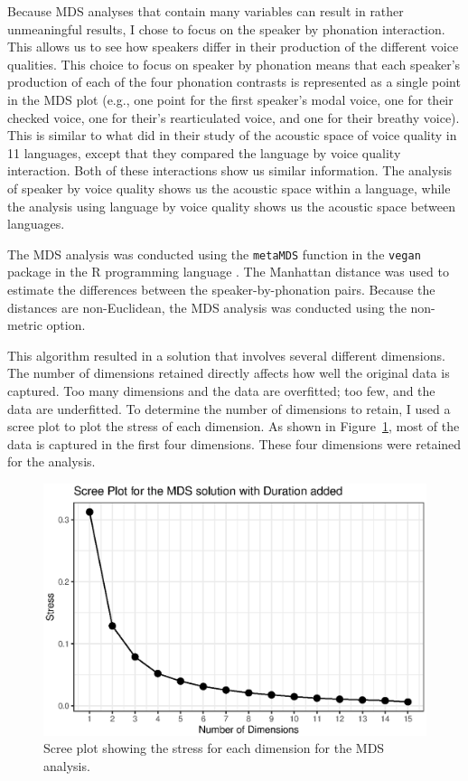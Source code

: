 Because MDS analyses that contain many variables can result in rather unmeaningful results, I chose to focus on the speaker by phonation interaction. This allows us to see how speakers differ in their production of the different voice qualities. This choice to focus on speaker by phonation means that each speaker's production of each of the four phonation contrasts is represented as a single point in the MDS plot (e.g., one point for the first speaker's modal voice, one for their checked voice, one for their's rearticulated voice, and one for their breathy voice). This is similar to what \citet{keatingCrosslanguageAcousticSpace2023} did in their study of the acoustic space of voice quality in 11 languages, except that they compared the language by voice quality interaction. Both of these interactions show us similar information. The analysis of speaker by voice quality shows us the acoustic space within a language, while the analysis using language by voice quality shows us the acoustic space between languages.

The MDS analysis was conducted using the \texttt{metaMDS} function in the \texttt{vegan} package \citep{oksanenVeganCommunityEcology2025} in the R programming language \citep{rcoreteamLanguageEnvironmentStatistical2024}. The Manhattan distance was used to estimate the differences between the speaker-by-phonation pairs. Because the distances are non-Euclidean, the MDS analysis was conducted using the non-metric option.

This algorithm resulted in a solution that involves several different dimensions. The number of dimensions retained directly affects how well the original data is captured. Too many dimensions and the data are overfitted; too few, and the data are underfitted. To determine the number of dimensions to retain, I used a scree plot to plot the stress of each dimension. As shown in Figure~\ref{fig:stress_plot}, most of the data is captured in the first four dimensions. These four dimensions were retained for the analysis.

\begin{figure}[!ht]
    \centering
    \includegraphics[width = 0.9\linewidth]{images/MDS/stress_plot_dur.eps}
    \caption{Scree plot showing the stress for each dimension for the MDS analysis.}
    \label{fig:stress_plot}
\end{figure}

